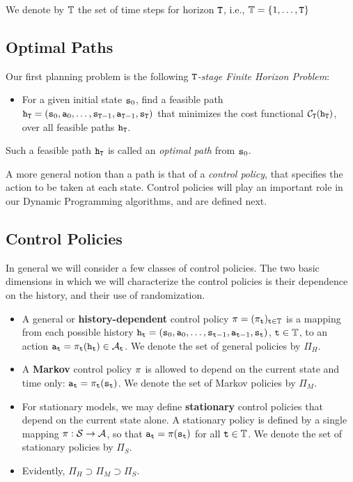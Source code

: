 We denote by $\mathbb{T}$ the set of time steps for horizon ${\tt T}$, i.e.,
$\mathbb{T}=\{1, \ldots, {\tt T}\}$


\subsection{Optimal Paths}

Our first planning problem is the following \emph{${\tt T}$-stage
Finite Horizon Problem}:
\begin{itemize}
\item For a given initial state ${{\tt s}_0}$, find a feasible path
  ${{\tt h}_{\tt T}} = ({{\tt s}_0},{{\tt a}_0}, \ldots ,{{\tt s}_{{\tt T} - 1}},{{\tt a}_{{\tt T} - 1}},{{\tt s}_{\tt T}})$
  that minimizes the cost functional ${\mathcal{C}_{\tt T}}({{\tt h}_{\tt T}})$, over all feasible paths ${{\tt h}_{\tt T}}$.
\end{itemize}
%
Such a feasible path ${{\tt h}_{\tt T}}$ is called an
\emph{optimal path} from ${{\tt s}_0}$.

A more general notion than a path is that of a \emph{control
policy}, that specifies the action to be taken at each state.
Control policies will play an important role in our Dynamic
Programming algorithms, and are defined next.

\subsection{Control Policies}

In general we will consider a few classes of control policies. The
two basic dimensions in which we will characterize the control
policies is their dependence on the history, and their use of
randomization.


\begin{itemize}
\item
A general or \textbf{history-dependent} control policy $\pi  =
{({\pi _{\tt t}})_{{\tt t} \in \mathbb{T}}}$ is a mapping from each
possible history ${{\tt h}_{\tt t}} = ({{\tt s}_0},{{\tt a}_0},
\ldots ,{{\tt s}_{{\tt t}-1}},{{\tt a}_{{\tt t}-1}},{{\tt s}_{\tt t}})$,
${\tt t} \in \mathbb{T}$, to an action ${{\tt a}_{\tt t}} = {\pi
_{\tt t}}({{\tt h}_{\tt t}}) \in {\mathcal{A}_{\tt t}}$.  We denote the
set of general policies by ${\Pi _H}$.
%
\item
A \textbf{Markov} control policy $\pi $ is allowed to depend on
the current state and time only: ${{\tt a}_{\tt t}} = {\pi
_{\tt t}}({{\tt s}_{\tt t}})$.   We denote the set of Markov policies
by ${\Pi _M}$.
%
\item
For stationary models, we may define \textbf{stationary} control
policies that depend on the current state alone. A stationary policy
is defined by a single mapping $\pi :\mathcal{S} \to \mathcal{A}$, so
that ${{\tt a}_{\tt t}} = \pi ({{\tt s}_{\tt t}})$ for all ${\tt t}
\in \mathbb{T}$. We denote the set of stationary policies by ${\Pi _S}$.
%
\item
Evidently, ${\Pi _H} \supset {\Pi _M} \supset {\Pi _S}$.
\end{itemize}

